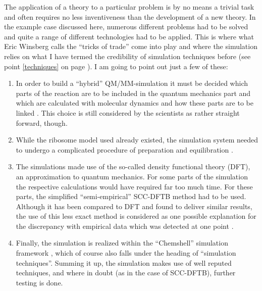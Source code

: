 \documentclass[onecollarge]{STJour}
\numberwithin{equation}{section}
\begin{document}
The application of a theory to a particular problem is by no means a
trivial task and often requires no less inventiveness than the
development of a new theory. In the example case discussed here, numerous
different problems had to be solved and quite a range of different
technologies had to be applied. This is where what Eric Winsberg calls
the ``tricks of trade'' \citep[p.\ 444]{winsberg:2001} come into play and
where the simulation relies on what I have termed the credibility of
simulation techniques before (see point \ref{techniques} on page
\pageref{techniques}). I am going to point out just a few of these:
\begin{enumerate}

 \item In order to build a ``hybrid'' QM/MM-simulation it must be decided
 which parts of the reaction are to be included in the quantum mechanics
 part and which are calculated with molecular dynamics and how these
 parts are to be linked \citep[p.\ 295]{kaestner-sherwood:2010}. This
 choice is still considered by the scientists as rather straight forward,
 though.

 \item While the ribosome model used already existed, the simulation
 system needed to undergo a complicated procedure of preparation and
 equilibration \citep[p.\ 295]{kaestner-sherwood:2010}.

 \item The simulations made use of the so-called density functional
 theory (DFT), an approximation to quantum mechanics. For some parts of
 the simulation the respective calculations would have required far too
 much time. For these parts, the simplified ``semi-empirical'' SCC-DFTB
 method had to be used. Although it has been compared to DFT and found to
 deliver similar results, the use of this less exact method is considered
 as one possible explanation for the discrepancy with empirical data
 which was detected at one point \citep[p.\ 304]{kaestner-sherwood:2010}.

 \item Finally, the simulation is realized within the ``Chemshell''
 simulation framework \citep{chemshell}, which of course also falls under
 the heading of ``simulation techniques''. Summing it up, the simulation
 makes use of well reputed techniques, and where in doubt (as in the case
 of SCC-DFTB), further testing is done.

\end{enumerate}
 
\end{document}
